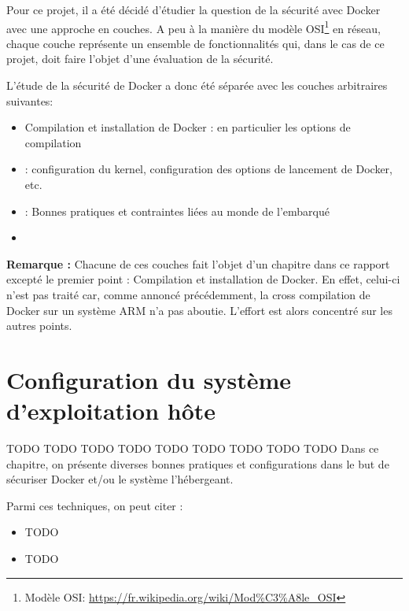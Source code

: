 \documentclass[11pt,a4paper,oneside]{report}
\begin{document}
Pour ce projet, il a été décidé d'étudier la question de la sécurité avec Docker avec une approche en couches. A peu à la manière du modèle OSI\footnote{Modèle OSI: \url{https://fr.wikipedia.org/wiki/Mod\%C3\%A8le_OSI}} en réseau, chaque couche représente un ensemble de fonctionnalités qui, dans le cas de ce projet, doit faire l'objet d'une évaluation de la sécurité.

L'étude de la sécurité de Docker a donc été séparée avec les couches arbitraires suivantes:

\begin{itemize}

\item Compilation et installation de Docker : en particulier les options  de compilation

\item {} : configuration du kernel, configuration des options de lancement de Docker, etc.

\item {} : Bonnes pratiques et contraintes liées au monde de l'embarqué

\item {}

\end{itemize}

\textbf{Remarque : } Chacune de ces couches fait l'objet d'un chapitre dans ce rapport excepté le premier point : Compilation et installation de Docker. En effet, celui-ci n'est pas traité car, comme annoncé précédemment, la cross compilation de Docker sur un système ARM n'a pas aboutie. L'effort est alors concentré sur les autres points.


\chapter{Configuration du système d'exploitation hôte}\label{config_systeme_os_hote}

TODO TODO TODO TODO TODO TODO TODO TODO TODO 
Dans ce chapitre, on présente diverses bonnes pratiques et configurations dans le but de sécuriser Docker et/ou le système l'hébergeant.

Parmi ces techniques, on peut citer :

\begin{itemize}
\item TODO
\item TODO
\end{itemize}
\end{document}
